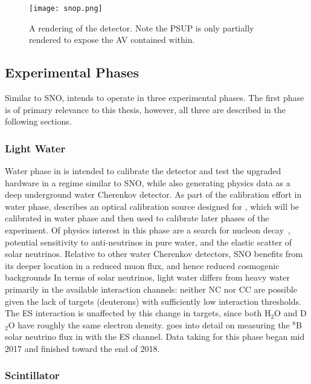 \begin{figure}
\centering
\texttt{[image: snop.png]}
\caption{\label{fig:snop}A rendering of the {\snop} detector. Note the PSUP is only partially rendered to expose the AV contained within.}
\end{figure}

\subsection{Experimental Phases}
Similar to SNO, {\snop} intends to operate in three experimental phases.
The first phase is of primary relevance to this thesis, however, all three are described in the following sections.

\subsubsection{Light Water}
Water phase in {\snop} is intended to calibrate the detector and test the upgraded hardware in a regime similar to SNO, while also generating physics data as a deep underground water Cherenkov detector.
As part of the calibration effort in water phase,  describes an optical calibration source designed for {\snop}, which will be calibrated in water phase and then used to calibrate later phases of the experiment.
Of physics interest in this phase are a search for nucleon decay~\cite{nucleon_decay}, potential sensitivity to anti-neutrinos in pure water, and the elastic scatter of solar neutrinos.
Relative to other water Cherenkov detectors, SNO benefits from its deeper location in a reduced muon flux, and hence reduced cosmogenic backgrounds
In terms of solar neutrinos, light water differs from heavy water primarily in the available interaction channels: neither NC nor CC are possible given the lack of targets (deuterons) with sufficiently low interaction thresholds.
The ES interaction is unaffected by this change in targets, since both H$_2$O and D$_2$O have roughly the same electron density.
 goes into detail on measuring the $^8$B solar neutrino flux in {\snop} with the ES channel.
Data taking for this phase began mid 2017 and finished toward the end of 2018.

\subsubsection{Scintillator}

